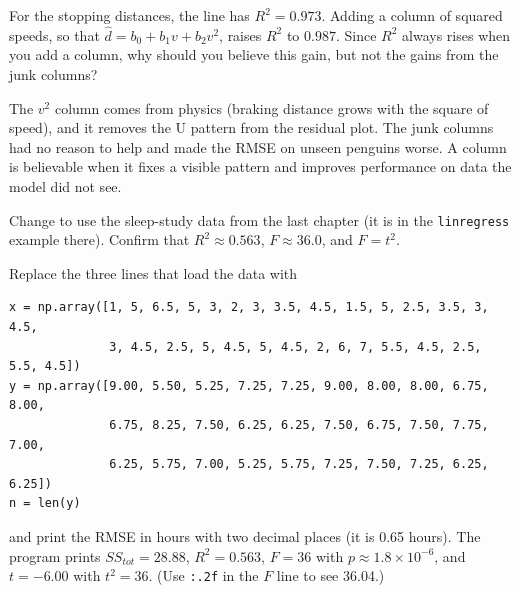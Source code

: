 \begin{Exercise}[label=lr2_6, title={Fix the stopping distance}]
For the stopping distances, the line has $R^2 = 0.973$. Adding a column of squared speeds, so that
$\hat{d} = b_0 + b_1 v + b_2 v^2$, raises $R^2$ to $0.987$. Since $R^2$ always rises when you add a column,
why should you believe this gain, but not the gains from the junk columns?
\end{Exercise}
\begin{Answer}[ref=lr2_6]
The $v^2$ column comes from physics (braking distance grows with the square of speed), and it removes the U
pattern from the residual plot. The junk columns had no reason to help and made the RMSE on unseen penguins worse. A
column is believable when it fixes a visible pattern and improves performance on data the model did not
see.
\end{Answer}

\begin{Exercise}[label=lr2_7, title={The sleep study in code}]
Change  to use the sleep-study data from the last chapter (it is in the
\verb|linregress| example there). Confirm that
$R^2 \approx 0.563$, $F \approx 36.0$, and $F = t^2$.
\end{Exercise}
\begin{Answer}[ref=lr2_7]
Replace the three lines that load the data with
\begin{verbatim}
x = np.array([1, 5, 6.5, 5, 3, 2, 3, 3.5, 4.5, 1.5, 5, 2.5, 3.5, 3, 4.5,
              3, 4.5, 2.5, 5, 4.5, 5, 4.5, 2, 6, 7, 5.5, 4.5, 2.5, 5.5, 4.5])
y = np.array([9.00, 5.50, 5.25, 7.25, 7.25, 9.00, 8.00, 8.00, 6.75, 8.00,
              6.75, 8.25, 7.50, 6.25, 6.25, 7.50, 6.75, 7.50, 7.75, 7.00,
              6.25, 5.75, 7.00, 5.25, 5.75, 7.25, 7.50, 7.25, 6.25, 6.25])
n = len(y)
\end{verbatim}
and print the RMSE in hours with two decimal places (it is 0.65 hours). The program prints $SS_{tot} = 28.88$,
$R^2 = 0.563$, $F = 36$ with $p \approx 1.8 \times 10^{-6}$, and $t = -6.00$ with $t^2 = 36$. (Use \verb|:.2f|
in the $F$ line to see 36.04.)
\end{Answer}

